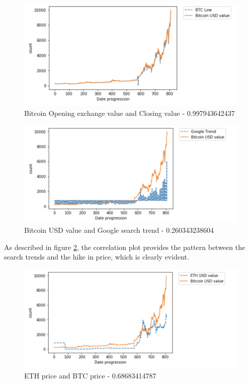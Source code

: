 \documentclass[sigconf]{acmart}
\begin{document}
\begin{figure}[!ht]
  \centering\includegraphics[width=\columnwidth]{PROJECT/images/low.png}
  \caption{Bitcoin Opening exchange value and Closing value - 0.997943642437}
  \label{4}
\end{figure}


\begin{figure}[!ht]
  \centering\includegraphics[width=\columnwidth]{PROJECT/images/googletrend.png}
  \caption{Bitcoin USD value and Google search trend - 0.260343238604}
  \label{5}
\end{figure}

As described in figure \ref{5}, the correlation plot provides the pattern between the search trends and the hike in price, which is clearly evident.

\begin{figure}[!ht]
  \centering\includegraphics[width=\columnwidth]{PROJECT/images/ethvalue.png}
  \caption{ETH price and BTC price - 0.68683414787 }
  \label{6}
\end{figure}
\end{document}
